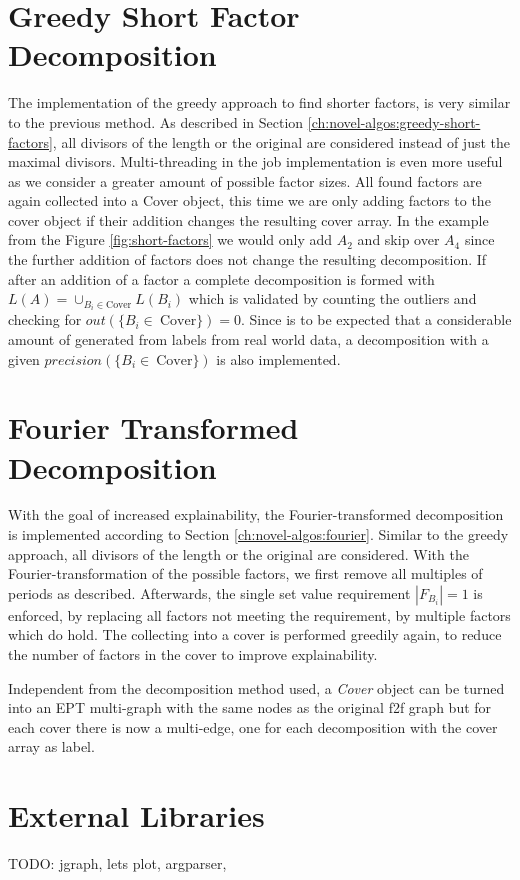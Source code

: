 \section{Greedy Short Factor Decomposition}
The implementation of the greedy approach to find shorter factors, is very similar to the previous method. As described in Section \ref{ch:novel-algos:greedy-short-factors}, all divisors of the length or the original \DFA are considered instead of just the maximal divisors. Multi-threading in the job implementation is even more useful as we consider a greater amount of possible factor sizes. All found factors are again collected into a Cover object, this time we are only adding factors to the cover object if their addition changes the resulting cover array. In the example from the Figure \ref{fig:short-factors} we would only add $A_2$ and skip over $A_4$ since the further addition of factors does not change the resulting decomposition. If after an addition of a factor a complete decomposition is formed with $L(A) = \cup_{B_i \in \text{Cover}} L(B_i)$ which is validated by counting the outliers and checking for $out(\{B_i \in~\text{Cover}\}) = 0$. Since is to be expected that a considerable amount of \DFAs generated from labels from real world data, a decomposition with a given $precision(\{B_i \in~\text{Cover}\})$ is also implemented.

\section{Fourier Transformed Decomposition}
With the goal of increased explainability, the Fourier-transformed decomposition is implemented according to Section \ref{ch:novel-algos:fourier}. Similar to the greedy approach, all divisors of the length or the original \DFA are considered. With the Fourier-transformation of the possible factors, we first remove all multiples of periods as described. Afterwards, the single set value requirement $|F_{B_i}| = 1$ is enforced, by replacing all factors not meeting the requirement, by multiple factors which do hold. The collecting into a cover is performed greedily again, to reduce the number of factors in the cover to improve explainability.

Independent from the decomposition method used, a \textit{Cover} object can be turned into an EPT multi-graph with the same nodes as the original f2f graph but for each cover there is now a multi-edge, one for each decomposition with the cover array as label.

\section{External Libraries}
TODO: jgraph, lets plot, argparser, 

